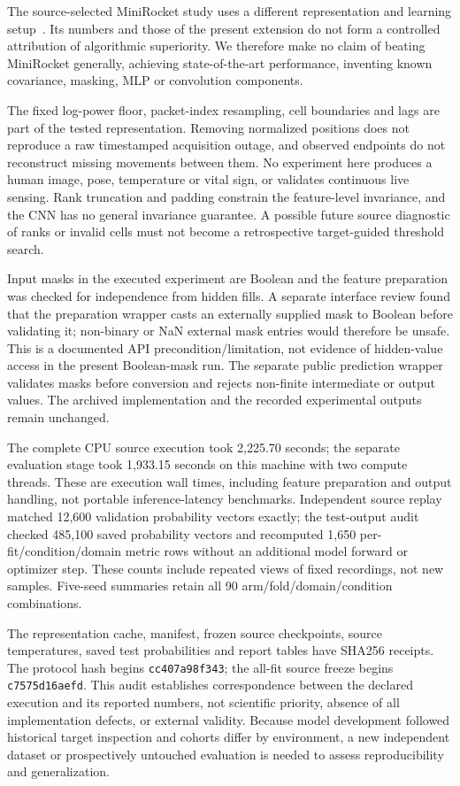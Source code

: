 The source-selected MiniRocket study uses a different representation and
learning setup~\cite{dempster2021}. Its numbers and those of the present
extension do not form a controlled attribution of algorithmic superiority.
We therefore make no claim of beating MiniRocket generally, achieving
state-of-the-art performance, inventing known
covariance, masking, MLP or convolution components.

The fixed log-power floor, packet-index resampling, cell boundaries and
lags are part of the tested representation. Removing normalized positions
does not reproduce a raw timestamped acquisition outage, and observed
endpoints do not reconstruct missing movements between them. No experiment
here produces a human image, pose, temperature or vital sign, or validates
continuous live sensing. Rank truncation and padding constrain the feature-level
invariance, and the CNN has no general invariance guarantee. A possible
future source diagnostic of ranks or invalid cells must not become a
retrospective target-guided threshold search.

Input masks in the executed experiment are Boolean and the feature preparation
was checked for independence from hidden fills. A separate interface review
found that the preparation wrapper casts an externally supplied mask to
Boolean before validating it; non-binary or NaN external mask entries would
therefore be unsafe. This is a documented API precondition/limitation, not
evidence of hidden-value access in the present Boolean-mask run. The separate public prediction wrapper validates masks before conversion and rejects non-finite intermediate or output values. The archived implementation and the recorded experimental outputs remain unchanged.

The complete CPU source execution took 2,225.70 seconds; the separate
evaluation stage took 1,933.15 seconds on this machine with two compute
threads. These are execution wall times, including feature preparation and
output handling, not portable inference-latency benchmarks. Independent
source replay matched 12,600 validation probability vectors exactly; the
test-output audit checked 485,100 saved probability vectors and recomputed
1,650 per-fit/condition/domain metric rows without an additional model
forward or optimizer step. These counts include repeated views of fixed
recordings, not new samples. Five-seed summaries retain all 90
arm/fold/domain/condition combinations.

The representation cache, manifest, frozen source checkpoints, source
temperatures, saved test probabilities and report tables have SHA256 receipts.
The protocol hash begins \texttt{cc407a98f343}; the all-fit source freeze
begins \texttt{c7575d16aefd}. This audit establishes correspondence between
the declared execution and its reported numbers, not scientific priority,
absence of all implementation defects, or external validity. Because model
development followed historical target inspection and cohorts differ by
environment, a new independent dataset or prospectively untouched evaluation
is needed to assess reproducibility and generalization.
